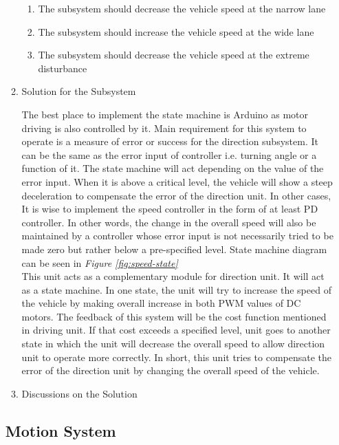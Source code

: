 \documentclass[a4paper,12pt]{article}
\begin{document}
\begin{enumerate}
\begin{enumerate}
				\begin{enumerate}
					\item The subsystem should decrease the vehicle speed at the narrow lane 
					\item The subsystem should increase the vehicle speed at the wide lane
					\item The subsystem should decrease the vehicle speed at the extreme disturbance  
				\end{enumerate}
					
			\item {Solution for the Subsystem}
	
			The best place to implement the state machine is Arduino as motor driving is also controlled by it. Main requirement for this system to operate is a measure of error or success for the direction subsystem. It can be the same as the error input of controller i.e. turning angle or a function of it. The state machine will act depending on the value of the error input. When it is above a critical level, the vehicle will show a steep deceleration to compensate the error of the direction unit. In other cases, It is wise to implement the speed controller in the form of at least PD controller. In other words, the change in the overall speed will also be maintained by a controller whose error input is not necessarily tried to be made zero but rather below a pre-specified level. State machine diagram can be seen in \textit{Figure \ref{fig:speed-state}}\\
		
	This unit acts as a complementary module for direction unit. It will act as a state machine. In one state, the unit will try to increase the speed of the vehicle by making overall increase in both PWM values of DC motors. The feedback of this  system will be the cost function mentioned in driving unit. If that cost exceeds a specified level, unit goes to another state in which the unit will decrease the overall speed to allow direction unit to operate more correctly. In short, this unit tries to compensate the error of the direction unit by changing the overall speed of the vehicle.
			
			\item {Discussions on the Solution}
			
		\end{enumerate}
			

	
		
		
		\subsection{Motion System}
		

\end{enumerate}
\end{document}
